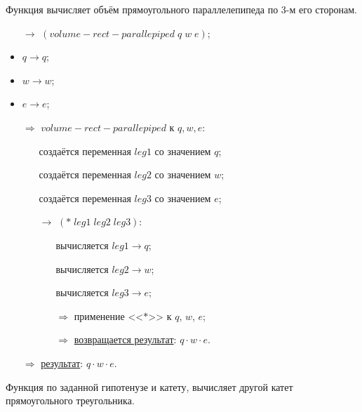 \problem Функция вычисляет объём прямоугольного параллелепипеда по 3-м его сторонам.


\begin{itemize}
	\item[$\longrightarrow$] $(volume\!-\!rect\!-\!parallepiped\; q\; w\; e)$;
	\item $q \to q$;
	\item $w \to w$;
	\item $e \to e$;
	\item[$\Longrightarrow$]  $volume\!-\!rect\!-\!parallepiped$ к $q, w, e$:
	\begin{itemize}
		\item[\textbullet] создаётся переменная $leg1$ со значением $q$;
		\item[\textbullet] создаётся переменная $leg2$ со значением $w$;
		\item[\textbullet] создаётся переменная $leg3$ со значением $e$;
		\item[$\longrightarrow$] $(*\; leg1\; leg2\; leg3)$:
		\begin{itemize}
			\item[\textbullet] вычисляется $leg1 \to q$;
			\item[\textbullet] вычисляется $leg2 \to w$;
			\item[\textbullet] вычисляется $leg3 \to e$;
			\item[$\Longrightarrow$] применение <<$*$>> к $q$, $w$, $e$;
			\item[$\Longrightarrow$] \underline{возвращается результат}: $q \cdot w \cdot e$.
		\end{itemize}
	\end{itemize}
	\item[$\Longrightarrow$] \underline{результат}: $q \cdot w \cdot e$.
\end{itemize}


\problem Функция по заданной гипотенузе и катету, вычисляет другой катет прямоугольного треугольника.


